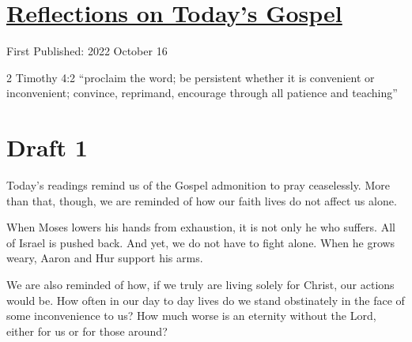 \documentclass[12pt]{article}[titlepage]
\newcommand{\say}[1]{``#1''}
\newcommand{\1}{\={a}}
\newcommand{\2}{\={e}}
\newcommand{\3}{\={\i}}
\newcommand{\4}{\=o}
\newcommand{\5}{\=u}
\newcommand{\6}{\={A}}
\renewcommand{\,}{\textsuperscript{,}}
\begin{document}
\doublespacing
\section{\href{reflections-on-readings-29-ordinary-c-22.html}{Reflections on Today's Gospel}}
First Published: 2022 October 16

2 Timothy 4:2 \say{proclaim the word; be persistent whether it is convenient or inconvenient; convince, reprimand, encourage through all patience and teaching}

\section{Draft 1}
Today's readings remind us of the Gospel admonition to pray ceaselessly.
More than that, though, we are reminded of how our faith lives do not affect us alone.

When Moses lowers his hands from exhaustion, it is not only he who suffers.
All of Israel is pushed back.
And yet, we do not have to fight alone.
When he grows weary, Aaron and Hur support his arms.

We are also reminded of how, if we truly are living solely for Christ, our actions would be.
How often in our day to day lives do we stand obstinately in the face of some inconvenience to us?
How much worse is an eternity without the Lord, either for us or for those around?
\end{document}
